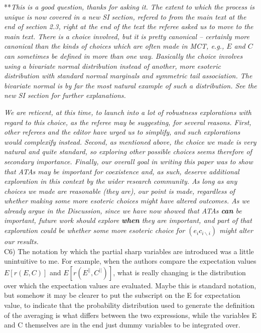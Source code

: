 \documentclass[letterpaper,11pt]{article}
\newcommand{\bs}{\backslash}
\begin{document}
\noindent ***\emph{This is a good question, thanks for asking it. The extent to which the process is 
unique is now covered in a new SI section, refered to from the main text at the end of section 2.3, 
right at the end of the text the referee asked us to move to the main text. There is a choice involved,
but it is pretty canonical -- certainly more canonical than the kinds of choices which are often made
in MCT, e.g., $E$ and $C$ can sometimes be defined in more than one way. Basically the choice involves 
using a bivariate normal distribution instead of another, more esoteric 
distribution with standard normal marginals and symmetric tail association. The bivariate normal is by far the 
most natural example of such a distribution. See the new SI section for further explanations. }

\emph{We are reticent, at this time, to launch into a lot of robustness explorations with regard to this choice, 
as the referee may be suggesting, for several reasons. First, other referees and the editor have urged us to
simplify, and such explorations would complexify instead. Second, as mentioned above, the choice we made is very
natural and quite standard, so exploring other possible choices seems therefore of 
secondary importance. Finally, our overall goal in writing this paper
was to show that ATAs may be important for coexistence and, as such, deserve additional exploration in this
context by the wider research community. As long as any choices we made are reasonable (they are), our point is
made, regardless of whether making some more esoteric choices might have altered outcomes. As we already argue in the
Discussion, since we have now showed that ATAs \textbf{can} be important, future work should explore \textbf{when} 
they are important, and part of 
that exploration could be whether some more esoteric choice for $(e_i c_{i \bs i})$ might alter our results. }\\

\noindent C6) The notation by which the partial sharp variables are introduced was a little unintuitive to me.  For example, when the authors compare the expectation values 
$E[r(E,C)]$ and $E[r(E^{||},C^{||})]$, what is really changing is the distribution over which the expectation values are evaluated.  Maybe this is standard notation, but somehow it may be clearer to put the subscript on the E for expectation value, to indicate that the probability distribution used to generate the definition of the averaging is what differs between the two expressions, while the variables E and C themselves are in the end just dummy variables to be integrated over.  \\
\end{document}
